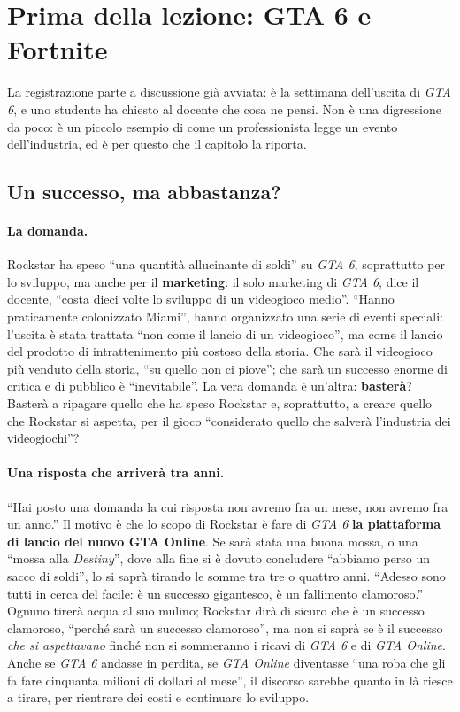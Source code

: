 \section{Prima della lezione: GTA 6 e Fortnite}
\label{gd14:sec:gta}

La registrazione parte a discussione già avviata: è la settimana dell'uscita di
\emph{GTA 6}, e uno studente ha chiesto al docente che cosa ne pensi. Non è una
digressione da poco: è un piccolo esempio di come un professionista legge un
evento dell'industria, ed è per questo che il capitolo la riporta.

\subsection{Un successo, ma abbastanza?}

\paragraph{La domanda.} Rockstar ha speso ``una quantità allucinante di soldi''
su \emph{GTA 6}, soprattutto per lo sviluppo, ma anche per il
\textbf{marketing}: il solo marketing di \emph{GTA 6}, dice il docente, ``costa
dieci volte lo sviluppo di un videogioco medio''. ``Hanno praticamente colonizzato
Miami'', hanno organizzato una serie di eventi speciali: l'uscita è stata
trattata ``non come il lancio di un videogioco'', ma come il lancio del prodotto
di intrattenimento più costoso della storia. Che sarà il videogioco più venduto
della storia, ``su quello non ci piove''; che sarà un successo enorme di critica
e di pubblico è ``inevitabile''. La vera domanda è un'altra: \textbf{basterà}? Basterà
a ripagare quello che ha speso Rockstar e, soprattutto, a creare quello che
Rockstar si aspetta, per il gioco ``considerato quello che salverà l'industria
dei videogiochi''?

\paragraph{Una risposta che arriverà tra anni.} ``Hai posto una domanda la cui
risposta non avremo fra un mese, non avremo fra un anno.'' Il motivo è che lo
scopo di Rockstar è fare di \emph{GTA 6} \textbf{la piattaforma di lancio del
nuovo GTA Online}. Se sarà stata una buona mossa, o una ``mossa alla
\emph{Destiny}'', dove alla fine si è dovuto concludere ``abbiamo perso un sacco
di soldi'', lo si saprà tirando le somme tra tre o quattro anni. ``Adesso sono
tutti in cerca del facile: è un successo gigantesco, è un fallimento clamoroso.''
Ognuno tirerà acqua al suo mulino; Rockstar dirà di sicuro che è un successo
clamoroso, ``perché sarà un successo clamoroso'', ma non si saprà se è il
successo \emph{che si aspettavano} finché non si sommeranno i ricavi di
\emph{GTA 6} e di \emph{GTA Online}. Anche se \emph{GTA 6} andasse in perdita, se
\emph{GTA Online} diventasse ``una roba che gli fa fare cinquanta milioni di
dollari al mese'', il discorso sarebbe quanto in là riesce a tirare, per rientrare
dei costi e continuare lo sviluppo.

